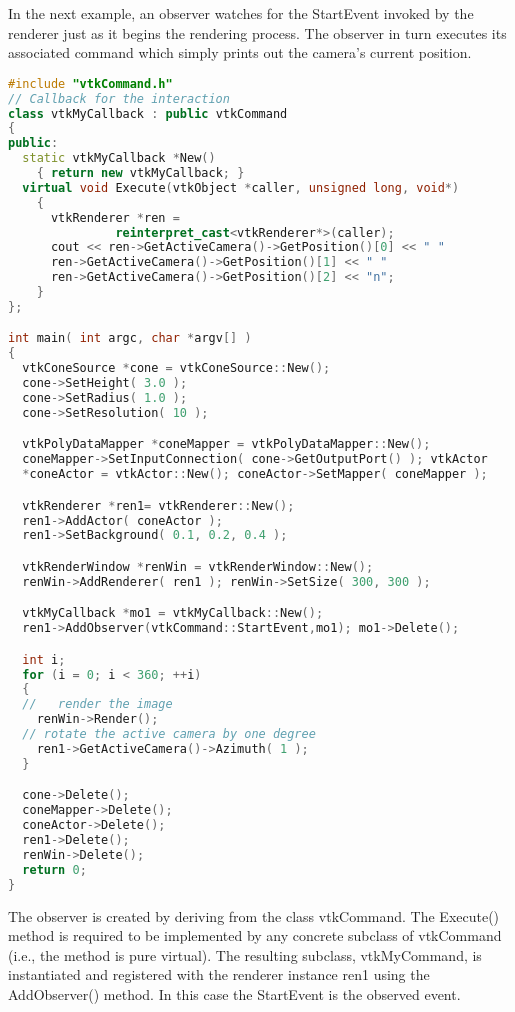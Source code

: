 In the next example, an observer watches for the StartEvent invoked by the renderer just as it begins the rendering process. The observer in turn executes its associated command which simply prints out the camera's current position.

\begin{lstlisting}[language=C++, caption={}]
#include "vtkCommand.h"
// Callback for the interaction
class vtkMyCallback : public vtkCommand
{
public:
  static vtkMyCallback *New()
    { return new vtkMyCallback; }
  virtual void Execute(vtkObject *caller, unsigned long, void*)
    {
      vtkRenderer *ren =
               reinterpret_cast<vtkRenderer*>(caller);
      cout << ren->GetActiveCamera()->GetPosition()[0] << " "
      ren->GetActiveCamera()->GetPosition()[1] << " "
      ren->GetActiveCamera()->GetPosition()[2] << "n";
    }
};

int main( int argc, char *argv[] )
{
  vtkConeSource *cone = vtkConeSource::New();
  cone->SetHeight( 3.0 );
  cone->SetRadius( 1.0 );
  cone->SetResolution( 10 );

  vtkPolyDataMapper *coneMapper = vtkPolyDataMapper::New();
  coneMapper->SetInputConnection( cone->GetOutputPort() ); vtkActor
  *coneActor = vtkActor::New(); coneActor->SetMapper( coneMapper );

  vtkRenderer *ren1= vtkRenderer::New();
  ren1->AddActor( coneActor );
  ren1->SetBackground( 0.1, 0.2, 0.4 );

  vtkRenderWindow *renWin = vtkRenderWindow::New();
  renWin->AddRenderer( ren1 ); renWin->SetSize( 300, 300 );

  vtkMyCallback *mo1 = vtkMyCallback::New();
  ren1->AddObserver(vtkCommand::StartEvent,mo1); mo1->Delete();

  int i;
  for (i = 0; i < 360; ++i)
  {
  //   render the image
    renWin->Render();
  // rotate the active camera by one degree
    ren1->GetActiveCamera()->Azimuth( 1 );
  }

  cone->Delete();
  coneMapper->Delete();
  coneActor->Delete();
  ren1->Delete();
  renWin->Delete();
  return 0;
}
\end{lstlisting}

The observer is created by deriving from the class vtkCommand. The Execute() method is required to be implemented by any concrete subclass of vtkCommand (i.e., the method is pure virtual). The resulting subclass, vtkMyCommand, is instantiated and registered with the renderer instance ren1 using the AddObserver() method. In this case the StartEvent is the observed event.

